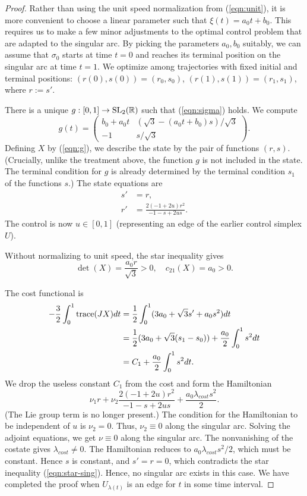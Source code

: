 \documentclass{article}
\theoremstyle{remark}
\newcommand{\ring}[1]{\mathbb{#1}}
\newcommand{\op}[1]{\hbox{#1}}
\def\SL{\op{SL}_2(\ring{R})}
\begin{document}
\begin{proof}
Rather than using the unit speed normalization from (\ref{eqn:unit}),
it is more convenient to choose a linear parameter such that $\xi(t) =
a_0 t + b_0$.  This requires us to make a few minor adjustments to the
optimal control problem that are adapted to the singular arc.  By
picking the parameters $a_0,b_0$ suitably, we can assume that
$\sigma_0$ starts at time $t=0$ and reaches its terminal position on
the singular arc at time $t=1$.  We optimize among trajectories with
fixed initial and terminal positions: $(r(0),s(0))=(r_0,s_0)$,
$(r(1),s(1))=(r_1,s_1)$, where $r:= s'$.

There is a unique  $g:[0,1]\to \SL$ such that
(\ref{eqn:sigma}) holds.  We compute
\[
g(t) = \begin{pmatrix}
b_0 + a_0 t & (\sqrt{3}-(a_0 t+ b_0) s)/{\sqrt{3}}\\
-1 & s/{\sqrt{3}}
\end{pmatrix}.
\]
Defining $X$ by (\ref{eqn:g}), we describe the state by the pair of
functions $(r,s)$.  (Crucially, unlike the treatment above, the
function $g$ is not included in the state.  The terminal condition for
$g$ is already determined by the terminal condition $s_1$ of the
functions $s$.)  The state equations are
\begin{align*}
s' &=  r,\\
r' &= \frac{2 (-1 + 2 u) r^2}{-1 - s + 2 u s}.
\end{align*}
The control is now $u\in [0,1]$ (representing an edge of the earlier
control simplex $U$).

Without normalizing to unit speed,
the star inequality gives
\begin{equation}\label{eqn:star-sing}
\det(X) = \frac{a_0 r}{\sqrt{3}}>0, \quad c_{21}(X) = a_0 > 0.
\end{equation}


The cost functional is 
\begin{align*}
-\frac{3}{2}\int_0^1 \op{trace}(J X) dt &= 
\frac{1}{2}\int_0^1 (3 a_0 +   \sqrt{3} s' + a_0 s^2) dt \\
&= 
\frac{1}{2} (3 a_0 + \sqrt{3}(s_1-s_0)) + \frac{a_0}{2} \int_0^1 s^2 dt\\
&= C_1 + \frac{a_0}{2} \int_0^1 s^2 dt.
\end{align*}
We drop the useless constant $C_1$ from the cost and form the
Hamiltonian
\[
\nu_1 r + \nu_2 
\frac{2 (-1 + 2 u) r^2}{-1 - s + 2 u s} + \frac{a_0\lambda_{cost} s^2}{2}.
\]
(The Lie group term is no longer present.)  The condition for the
Hamiltonian to be independent of $u$ is $\nu_2=0$.  Thus, $\nu_2
\equiv 0$ along the singular arc.  Solving the adjoint equations, we
get $\nu\equiv 0$ along the singular arc.  The nonvanishing of the
costate gives $\lambda_{cost}\ne 0$.  The Hamiltonian reduces to
$a_0\lambda_{cost} s^2/2$, which must be constant.  Hence $s$ is
constant, and $s'=r=0$, which contradicts the star inequality
(\ref{eqn:star-sing}).  Hence, no singular arc exists in this case.
We have completed the proof when $U_{\lambda(t)}$ is an edge for $t$
in some time interval.


\end{proof}
\end{document}
